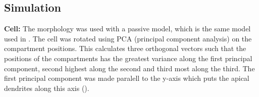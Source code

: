 \documentclass[altfont, fleqn]{uiophd}
\renewcommand{\cref}[1]{{\color{viridis_03}\mycref{#1}}}
\begin{document}
\subsection{Simulation}
\textbf{Cell:}
The \textcite{mainen_influence_1996} morphology was used with a passive model, which is 
the same model used in \textcite{pettersen_amplitude_2008}. 
The cell was rotated using PCA (principal component analysis) on the compartment
positions.
This calculates three orthogonal vectors such that 
the positions of the compartments 
has the greatest variance along the first principal component, 
second highest along the second and third most along the third.
The first principal component was made paralell to the y-axis which
puts the apical dendrites along this axis
(\cref{fig:4_1_morph}).
\\
\end{document}
